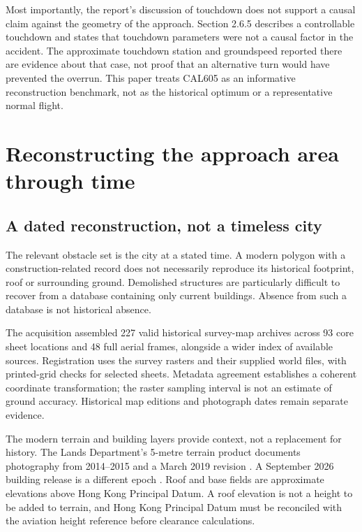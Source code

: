Most importantly, the report's discussion of touchdown does not support a causal claim against the geometry of the approach. Section 2.6.5 describes a controllable touchdown and states that touchdown parameters were not a causal factor in the accident. The approximate touchdown station and groundspeed reported there are evidence about that case, not proof that an alternative turn would have prevented the overrun. This paper treats CAL605 as an informative reconstruction benchmark, not as the historical optimum or a representative normal flight.


\section{Reconstructing the approach area through time}
\label{sec:geometry}
\subsection{A dated reconstruction, not a timeless city}
The relevant obstacle set is the city at a stated time. A modern polygon with a construction-related record does not necessarily reproduce its historical footprint, roof or surrounding ground. Demolished structures are particularly difficult to recover from a database containing only current buildings. Absence from such a database is not historical absence.

The acquisition assembled 227 valid historical survey-map archives across 93 core sheet locations and 48 full aerial frames, alongside a wider index of available sources. Registration uses the survey rasters and their supplied world files, with printed-grid checks for selected sheets. Metadata agreement establishes a coherent coordinate transformation; the raster sampling interval is not an estimate of ground accuracy. Historical map editions and photograph dates remain separate evidence.

The modern terrain and building layers provide context, not a replacement for history. The Lands Department's 5-metre terrain product documents photography from 2014--2015 and a March 2019 revision \cite{dtm}. A September 2026 building release is a different epoch \cite{buildings}. Roof and base fields are approximate elevations above Hong Kong Principal Datum. A roof elevation is not a height to be added to terrain, and Hong Kong Principal Datum must be reconciled with the aviation height reference before clearance calculations.

